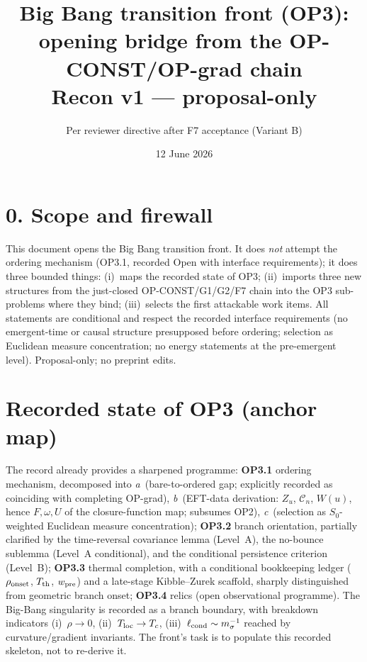 \documentclass[11pt,a4paper]{article}
\title{\textbf{Big Bang transition front (OP3): opening bridge from the
OP-CONST/OP-grad chain}\\\large Recon v1 --- proposal-only}
\author{Per reviewer directive after F7 acceptance (Variant B)}
\date{12 June 2026}
\begin{document}
\maketitle

\section*{0. Scope and firewall}
This document opens the Big Bang transition front. It does \emph{not}
attempt the ordering mechanism (OP3.1, recorded Open with interface
requirements); it does three bounded things: (i)~maps the recorded state of
OP3; (ii)~imports three new structures from the just-closed
OP-CONST/G1/G2/F7 chain into the OP3 sub-problems where they bind;
(iii)~selects the first attackable work items. All statements are
conditional and respect the recorded interface requirements (no
emergent-time or causal structure presupposed before ordering; selection as
Euclidean measure concentration; no energy statements at the pre-emergent
level). Proposal-only; no preprint edits.

\section{Recorded state of OP3 (anchor map)}
The record already provides a sharpened programme:
\textbf{OP3.1} ordering mechanism, decomposed into
\emph{a}~(bare-to-ordered gap; explicitly recorded as coinciding with
completing OP-grad), \emph{b}~(EFT-data derivation: $Z_u$, $\mathcal C_n$,
$W(u)$, hence $F,\omega,U$ of the closure-function map; subsumes OP2),
\emph{c}~(selection as $S_0$-weighted Euclidean measure concentration);
\textbf{OP3.2} branch orientation, partially clarified by the time-reversal
covariance lemma (Level~A), the no-bounce sublemma (Level~A conditional),
and the conditional persistence criterion (Level~B);
\textbf{OP3.3} thermal completion, with a conditional bookkeeping ledger
($\rho_{\rm onset}$, $T_{\rm th}$, $w_{\rm pre}$) and a late-stage
Kibble--Zurek scaffold, sharply distinguished from geometric branch onset;
\textbf{OP3.4} relics (open observational programme).
The Big-Bang singularity is recorded as a branch boundary, with breakdown
indicators (i)~$\rho\to0$, (ii)~$T_{\rm loc}\to T_c$,
(iii)~$\ell_{\rm cond}\sim m_\sigma^{-1}$ reached by curvature/gradient
invariants. The front's task is to populate this recorded skeleton, not to
re-derive it.
\end{document}
